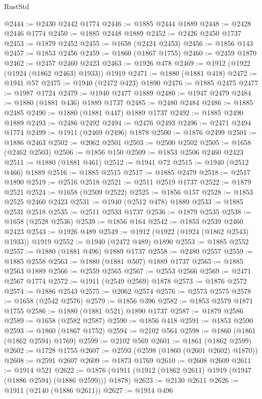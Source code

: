 \begin{lexlean}{RustStd}
\begin{coremodule}
@2444 := @2430 @2442 @1774
@2446 := @1885 @2444 @1889
@2448 := @2428 @2446 @1774
@2450 := @1885 @2448 @1889
@2452 := @2426 @2450 @1737
@2453 := @1879 @2452
@2455 := @1658 (@2424 @2453)
@2456 := @1856 @143
@2457 := @1853 @2456
@2459 := @1860 (@1867 @1755)
@2460 := @2459 @1870
@2462 := @2457 @2460 @2423
@2463 := @1926 @478
@2469 := @1912 (@1922 (@1924 (@1862 @2463) @1933)) @1919
@2471 := @1880 (@1881 @418)
@2472 := @1941 @57
@2475 := @1940 (@2472 @423) @1890
@2476 := @1885 @2475
@2477 := @1987 @1724
@2479 := @1940 @2477 @1889
@2480 := @1947 @2479
@2484 := @1880 (@1881 @436) @1889 @1737
@2485 := @2480 @2484
@2486 := @1885 @2485
@2490 := @1880 (@1881 @447) @1889 @1737
@2492 := @1885 @2490 @1889
@2493 := @2486 @2492
@2494 := @2476 @2493
@2496 := @2471 @2494 @1774
@2499 := @1911 (@2469 @2496) @1878
@2500 := @1876 @2499
@2501 := @1886 @2463
@2502 := @2062 @2501
@2503 := @2500 @2502
@2505 := @1658 (@2462 @2503)
@2506 := @1856 @150
@2509 := @1853 @2506 @2460 @2423
@2511 := @1880 (@1881 @461)
@2512 := @1941 @72
@2515 := @1940 (@2512 @466) @1889
@2516 := @1885 @2515
@2517 := @1885 @2479
@2518 := @2517 @1890
@2519 := @2516 @2518
@2521 := @2511 @2519 @1737
@2522 := @1879 @2521
@2524 := @1658 (@2509 @2522)
@2525 := @1856 @157
@2528 := @1853 @2525 @2460 @2423
@2531 := @1940 (@2512 @478) @1889
@2533 := @1885 @2531 @2518
@2535 := @2511 @2533 @1737
@2536 := @1879 @2535
@2538 := @1658 (@2528 @2536)
@2539 := @1856 @164
@2542 := @1853 @2539 @2460 @2423
@2543 := @1926 @489
@2549 := @1912 (@1922 (@1924 (@1862 @2543) @1933)) @1919
@2552 := @1940 (@2472 @489) @1890
@2553 := @1885 @2552
@2557 := @1880 (@1881 @496) @1889 @1737
@2558 := @2480 @2557
@2559 := @1885 @2558
@2563 := @1880 (@1881 @507) @1889 @1737
@2565 := @1885 @2563 @1889
@2566 := @2559 @2565
@2567 := @2553 @2566
@2569 := @2471 @2567 @1774
@2572 := @1911 (@2549 @2569) @1878
@2573 := @1876 @2572
@2574 := @1886 @2543
@2575 := @2062 @2574
@2576 := @2573 @2575
@2578 := @1658 (@2542 @2576)
@2579 := @1856 @396
@2582 := @1853 @2579 @1871 @1755
@2586 := @1880 (@1881 @521) @1890 @1737
@2587 := @1879 @2586
@2589 := @1658 (@2582 @2587)
@2590 := @1856 @418
@2591 := @1853 @2590
@2593 := @1860 (@1867 @1752)
@2594 := @2102 @564
@2598 := @1860 (@1861 (@1862 @2594) @1769)
@2599 := @2102 @569
@2601 := @1861 (@1862 @2599)
@2602 := @1728 @1755
@2607 := @2593 (@2598 (@1860 (@2601 @2602) @1870))
@2608 := @2591 @2607
@2609 := @1873 @1769
@2610 := @2608 @2609
@2611 := @1914 @521
@2622 := @1876 (@1911 (@1912 (@1862 @2611) @1919 (@1947 (@1886 @2594) (@1886 @2599))) @1878)
@2623 := @2130 @2611
@2626 := @1911 (@2140 (@1886 @2611))
@2627 := @1914 @496

\end{coremodule}
\end{lexlean}
